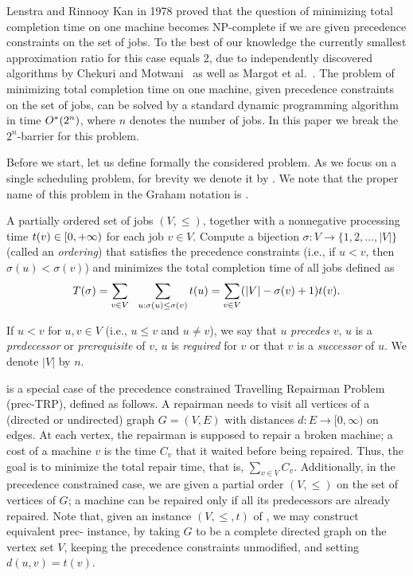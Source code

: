 \documentclass{article}
\theoremstyle{definition}
\begin{document}
Lenstra and Rinnooy Kan \cite{lenstra} in 1978 proved that
the question of minimizing total completion time on one machine becomes NP-complete
if we are given precedence constraints on the set of jobs.
To the best of our knowledge the currently smallest approximation ratio for this case equals $2$,
due to independently discovered algorithms by Chekuri and Motwani~\cite{chekuri} as well as Margot et al.~\cite{margot}.
The problem of minimizing total completion time on one machine, given
precedence constraints on the set of jobs, can be solved
by a standard dynamic programming algorithm in time $O^\ast(2^n)$, where $n$ denotes the
number of jobs.
In this paper we break the $2^n$-barrier for this problem.

Before we start, let us define formally the considered problem.
As we focus on a single scheduling problem, for brevity we
denote it by \schedname{}. We note that the proper name of this problem in the Graham notation
    is \schedlongname{}.

{A partially ordered set of jobs $(V, \leq)$,
together with a nonnegative processing time $t(v) \in [0,+\infty)$ for each job $v \in V$.
}
{
Compute a bijection $\sigma:V \to \{1,2,\ldots,|V|\}$ (called an {\em{ordering}})
that satisfies the precedence constraints (i.e., if $u < v$, then $\sigma(u) < \sigma(v)$)
and minimizes the total completion time of all jobs defined as
$$\koszt{\sigma} = \sum_{v \in V}\ \ \sum_{u:\sigma(u) \leq \sigma(v)} \czas{u} = \sum_{v \in V} (|V|-\sigma(v)+1)\czas{v}.$$
}

If $u < v$ for $u,v \in V$ (i.e., $u \leq v$ and $u \neq v$),
we say that $u$ {\em{precedes}} $v$, $u$ is a {\em{predecessor}}
or {\em{prerequisite}} of $v$, $u$ is {\em{required}} for $v$ or that $v$ is a {\em{successor}}
of $u$. We denote $|V|$ by $n$.

\schedname{} is a special case of the precedence constrained Travelling Repairman Problem (prec-{\sc TRP}), defined as follows. A repairman needs to visit all vertices of a (directed
or undirected) graph $G=(V,E)$ with distances $d:E \to [0,\infty)$ on edges.
At each vertex, the repairman is supposed to repair a broken machine;
a cost of a machine $v$ is the time $C_v$ that it waited before being repaired.
Thus, the goal is to minimize the total repair time, that is, $\sum_{v \in V} C_v$.
Additionally, in the precedence constrained case, we are given a partial order $(V,\leq)$
on the set of vertices of $G$; a machine can be repaired only if all its predecessors
are already repaired.
Note that, given an instance $(V,\leq,t)$ of \schedname{},
we may construct equivalent prec-{} instance, by taking $G$ to be a complete directed
graph on the vertex set $V$, keeping the precedence constraints unmodified, and setting
$d(u,v) = t(v)$.
\end{document}
